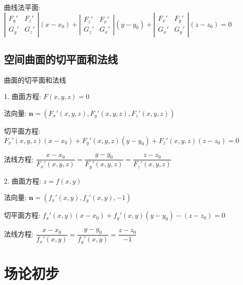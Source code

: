 \begin{definition}[曲线切线和法平面]
	曲线法平面: $\left| \begin{array}{ll}
		F_{y}'&F_{z}'\\G_{y}'&G_{z}'
	\end{array}\right|(x-x_{0})+\left|\begin{array}{ll}
		F_{z}'&F_{x}'\\G_{z}'&G_{x}'
	\end{array} \right|(y-y_{0})+\left|\begin{array}{ll}
		F_{x}'&F_{y}'\\G_{x}'&G_{y}'
	\end{array} \right|(z-z_{0})=0$
	
	
\end{definition}
\subsection{空间曲面的切平面和法线}
\begin{definition}
	曲面的切平面和法线
	
	1. 曲面方程:  $F(x,y,z)=0$
	
	法向量: $\textbf{n}=(F_{x}'(x,y,z),F_{y}'(x,y,z),F_{z}'(x,y,z))$
	
	切平面方程: $F_{x}'(x,y,z)(x-x_{0})+F_{y}'(x,y,z)(y-y_{0})+F_{z}'(x,y,z)(z-z_{0})=0$
	
	法线方程: $\dfrac{x-x_{0}}{F_{x}'(x,y,z)}=\dfrac{y-y_{0}}{F_{y}'(x,y,z)}=\dfrac{z-z_{0}}{F_{z}'(x,y,z)}$
	
	2. 曲面方程:  $z=f(x,y)$
	
	法向量: $\textbf{n}=(f_{x}'(x,y),f_{y}'(x,y),-1)$
	
	切平面方程: $f_{x}'(x,y)(x-x_{0})+f_{y}'(x,y)(y-y_{0})-(z-z_{0})=0$
	
	法线方程: $\dfrac{x-x_{0}}{f_{x}'(x,y)}=\dfrac{y-y_{0}}{f_{y}'(x,y)}=\dfrac{z-z_{0}}{-1}$
\end{definition}
\section{场论初步}
